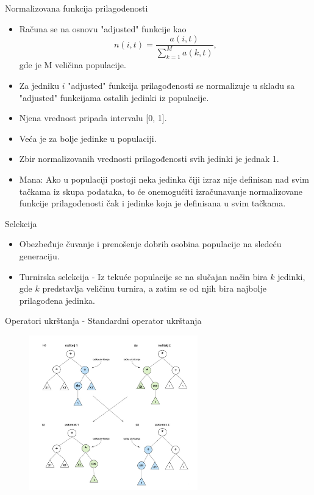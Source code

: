 \documentclass{beamer}
\begin{document}
\begin{frame}{Normalizovana funkcija prilagođenosti}
\begin{itemize}
    \small
    \item Računa se na osnovu "adjusted" funkcije kao
    \[ n(i,t) = \frac{a(i,t)}{\sum_{k=1}^{M}a(k,t)}, \]
    gde je M veličina populacije.
    \item Za jedniku $i$ "adjusted" funkcija prilagođenosti se normalizuje u skladu sa "adjusted" funkcijama ostalih jedinki iz populacije.
    \item Njena vrednost pripada intervalu [0, 1].
    \item Veća je za bolje jedinke u populaciji.
    \item Zbir normalizovanih vrednosti prilagođenosti svih jedinki je jednak 1.
    \item Mana: Ako u populaciji postoji neka jedinka čiji izraz nije definisan nad svim tačkama iz skupa podataka, to će onemogućiti izračunavanje normalizovane funkcije prilagođenosti čak i jedinke koja je definisana u svim tačkama.
\end{itemize}
\end{frame}

\begin{frame}{Selekcija}
\begin{itemize}
    \item Obezbeđuje čuvanje i prenošenje dobrih osobina populacije na sledeću generaciju.
    \item Turnirska selekcija - Iz tekuće populacije se na slučajan način bira $k$ jedinki, gde $k$ predstavlja veličinu turnira, a zatim se od njih bira najbolje prilagođena jedinka.
\end{itemize}
\end{frame}


\begin{frame}{Operatori ukrštanja - Standardni operator ukrštanja}

\begin{figure}[!ht]
\begin{center}
\includegraphics[width=0.65\textwidth]{images/standard_crossover4.jpg}
\end{center}
\label{fig:standardCrossover}
\end{figure}

\end{frame}
\end{document}
